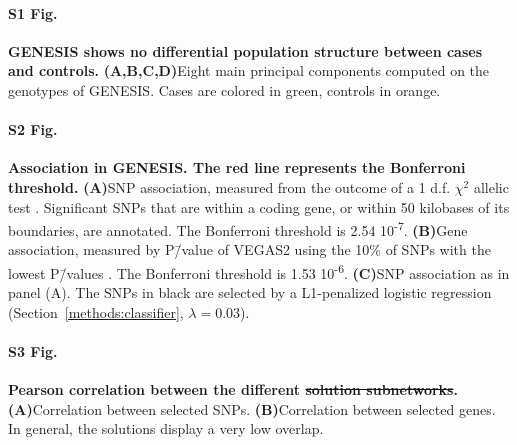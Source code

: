 \documentclass[10pt,letterpaper]{article}
\providecommand{\DIFaddtex}[1]{{\protect\color{blue}\uwave{#1}}} %
\providecommand{\DIFdeltex}[1]{{\protect\color{red}\sout{#1}}}                      %
\providecommand{\DIFaddbegin}{} %
\providecommand{\DIFaddend}{} %
\providecommand{\DIFdelbegin}{} %
\providecommand{\DIFdelend}{} %
\providecommand{\DIFadd}[1]{\texorpdfstring{\DIFaddtex{#1}}{#1}} %
\providecommand{\DIFdel}[1]{\texorpdfstring{\DIFdeltex{#1}}{}} %
\newcommand{\DIFscaledelfig}{0.5}
\newlength{\DIFdelgraphicswidth} %
\newlength{\DIFdelgraphicsheight} %
\newcommand{\DIFaddincludegraphics}[2][]{{\color{blue}\fbox{\DIFOincludegraphics[#1]{#2}}}} %
\newcommand{\DIFdelincludegraphics}[2][]{%
\sbox{\DIFdelgraphicsbox}{\DIFOincludegraphics[#1]{#2}}%
\settoboxwidth{\DIFdelgraphicswidth}{\DIFdelgraphicsbox} %
\settoboxtotalheight{\DIFdelgraphicsheight}{\DIFdelgraphicsbox} %
\scalebox{\DIFscaledelfig}{%
\parbox[b]{\DIFdelgraphicswidth}{\usebox{\DIFdelgraphicsbox}\\[-\baselineskip] \rule{\DIFdelgraphicswidth}{0em}}\llap{\resizebox{\DIFdelgraphicswidth}{\DIFdelgraphicsheight}{%
\setlength{\unitlength}{\DIFdelgraphicswidth}%
\begin{picture}(1,1)%
\thicklines\linethickness{2pt} %
{\color[rgb]{1,0,0}\put(0,0){\framebox(1,1){}}}%
{\color[rgb]{1,0,0}\put(0,0){\line( 1,1){1}}}%
{\color[rgb]{1,0,0}\put(0,1){\line(1,-1){1}}}%
\end{picture}%
}\hspace*{3pt}}} %
} %
\DeclareRobustCommand{\DIFaddbegin}{\DIFOaddbegin \let\includegraphics\DIFaddincludegraphics} %
\DeclareRobustCommand{\DIFaddend}{\DIFOaddend \let\includegraphics\DIFOincludegraphics} %
\DeclareRobustCommand{\DIFdelbegin}{\DIFOdelbegin \let\includegraphics\DIFdelincludegraphics} %
\DeclareRobustCommand{\DIFdelend}{\DIFOaddend \let\includegraphics\DIFOincludegraphics} %
\begin{document}
\DIFaddend \paragraph*{S1 Fig.}
\label{sfig:pcs}
{\bf GENESIS shows no differential population structure between cases and controls.} \textbf{(A,B,C,D)}\DIFaddbegin \DIFadd{~}\DIFaddend Eight main principal components computed on the genotypes of GENESIS. Cases are colored in green, controls in orange.

\paragraph*{S2 Fig.}
\label{sfig:snp_gene_manhattan}
{\bf Association in GENESIS. The red line represents the Bonferroni threshold.} \textbf{(A)}\DIFaddbegin \DIFadd{~}\DIFaddend SNP association, measured from the outcome of a 1 d.f. $\chi^2$ allelic test \DIFaddbegin \DIFadd{(Section~\ref{methods:conventional})}\DIFaddend . Significant SNPs that are within a coding gene, or within 50 kilobases of its boundaries, are annotated. The Bonferroni threshold is 2.54 \texttimes{} 10\textsuperscript{-7}. \textbf{(B)}\DIFaddbegin \DIFadd{~}\DIFaddend Gene association, measured by P\=/value of VEGAS2 \cite{mishra_vegas2:_2015} using the 10\% of SNPs with the lowest P\=/values \DIFaddbegin \DIFadd{(Section~\ref{methods:conventional})}\DIFaddend . The Bonferroni threshold is 1.53 \texttimes{} 10\textsuperscript{-6}. \textbf{(C)}\DIFaddbegin \DIFadd{~}\DIFaddend SNP association as in panel (A). The SNPs in black are selected by a L1-penalized logistic regression (Section~\ref{methods:classifier}, $\lambda = 0.03$).

\paragraph*{S3 Fig.}
\label{sfig:pearson_methods}
{\bf Pearson correlation between the different \DIFdelbegin \DIFdel{solution subnetworks}\DIFdelend \DIFaddbegin \DIFadd{solutions}\DIFaddend . } \textbf{(A)}\DIFaddbegin \DIFadd{~}\DIFaddend Correlation between selected SNPs. \textbf{(B)}\DIFaddbegin \DIFadd{~}\DIFaddend Correlation between selected genes. In general, the solutions display a very low overlap.
\end{document}
